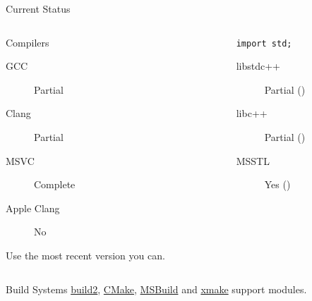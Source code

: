 \documentclass[]{beamer}
\begin{document}
\begin{frame}{Current Status}
  \begin{columns}[t]
    \begin{column}{0.5\textwidth}
      \begin{block}{Compilers}
        \small
        \begin{description}
          \item[GCC] Partial 
          \item[Clang] Partial
          \item[MSVC] Complete
          \item[Apple Clang] No
        \end{description}
        Use the most recent version you can.
      \end{block}
    \end{column}

    \begin{column}{0.5\textwidth}
      \begin{block}{\texttt{import std;}}
        \small
        \begin{description}
          \item[libstdc++] Partial ()
          \item[libc++] Partial ()
          \item[MSSTL] Yes ()
        \end{description}
      \end{block}
    \end{column}
  \end{columns}

  \vspace{1em}

  \begin{block}{Build Systems}
    \href{https://build2.org/}{build2}, \href{https://cmake.org/}{CMake},
    \href{https://learn.microsoft.com/en-us/visualstudio/msbuild/msbuild-command-line-reference?view=vs-2022}{MSBuild}
    and \href{https://xmake.io/}{xmake} support modules.
  \end{block}
\end{frame}
\end{document}
